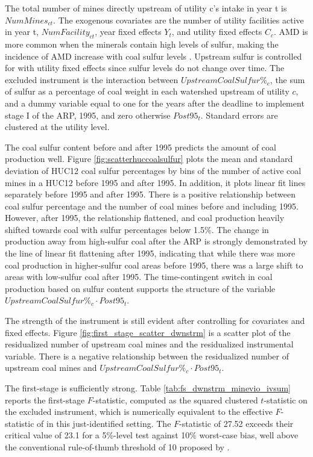 \documentclass[12pt]{article}
\begin{document}
The total number of mines directly upstream of utility c's intake in year t is $NumMines_{ct}$. The exogenous covariates are the number of utility facilities active in year t, $NumFacility_{ct}$, year fixed effects $Y_t$, and utility fixed effects $C_c$. AMD is more common when the minerals contain high levels of sulfur, making the incidence of AMD increase with coal sulfur levels \parencite{schweinfurth2009introduction}. Upstream sulfur is controlled for with utility fixed effects since sulfur levels do not change over time. The excluded instrument is the interaction between $UpstreamCoalSulfur\%_c$, the sum of sulfur as a percentage of coal weight in each watershed upstream of utility $c$, and a dummy variable equal to one for the years after the deadline to implement stage I of the ARP, 1995, and zero otherwise $Post95_t$. Standard errors are clustered at the utility level. 

The coal sulfur content before and after 1995 predicts the amount of coal production well. Figure \ref{fig:scatterhuccoalsulfur} plots the mean and standard deviation of HUC12 coal sulfur percentages by bins of the number of active coal mines in a HUC12 before 1995 and after 1995. In addition, it plots linear fit lines separately before 1995 and after 1995. There is a positive relationship between coal sulfur percentage and the number of coal mines before and including 1995. However, after 1995, the relationship flattened, and coal production heavily shifted towards coal with sulfur percentages below 1.5\%. The change in production away from high-sulfur coal after the ARP is strongly demonstrated by the line of linear fit flattening after 1995, indicating that while there was more coal production in higher-sulfur coal areas before 1995, there was a large shift to areas with low-sulfur coal after 1995. The time-contingent switch in coal production based on sulfur content supports the structure of the variable $UpstreamCoalSulfur\%_c \cdot Post95_t$.

The strength of the instrument is still evident after controlling for covariates and fixed effects. Figure \ref{fig:first_stage_scatter_dwnstrm} is a scatter plot of the residualized number of upstream coal mines and the residualized instrumental variable. There is a negative relationship between the residualized number of upstream coal mines and $UpstreamCoalSulfur\%_c \cdot Post95_t$.

The first-stage is sufficiently strong. Table \ref{tab:fs_dwnstrm_minevio_ivsum} reports the first-stage $F$-statistic, computed as the squared clustered $t$-statistic on the excluded instrument, which is numerically equivalent to the effective $F$-statistic of \textcite{montielolea2013robust} in this just-identified setting. The $F$-statistic of 27.52 exceeds their critical value of 23.1 for a 5\%-level test against 10\% worst-case bias, well above the conventional rule-of-thumb threshold of 10 proposed by \textcite{staigerstock1997instrumental}.
\end{document}
